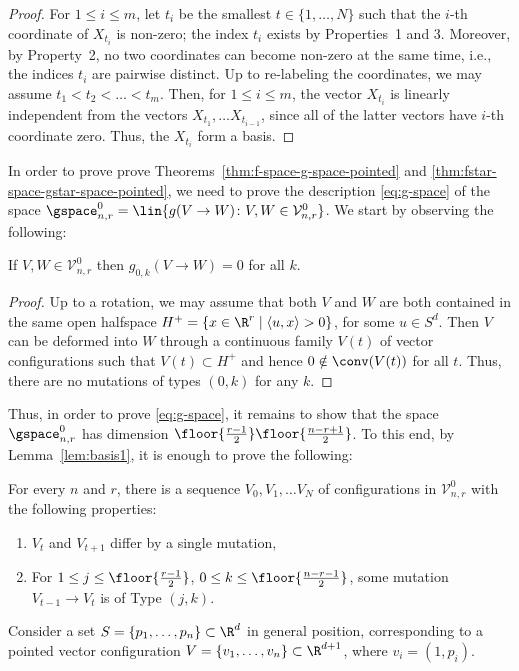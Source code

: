 %
\begin{proof}
For $1 \leq i\leq m$, let $t_i$ be the smallest $t\in \{1,\dots,N\}$ such that the $i$-th coordinate of $X_{t_i}$ is non-zero; the index $t_i$ exists by Properties~1 and 3. Moreover, by Property~2, no two coordinates can become non-zero at the same time, i.e., the indices $t_i$ are pairwise distinct. Up to re-labeling the coordinates, we may assume $t_1 < t_2 < \ldots < t_m$. Then, for $1\leq i \leq m$, the vector $X_{t_i}$ is linearly independent from the vectors $X_{t_1},\dots X_{t_{i-1}}$, since all of the latter vectors have $i$-th coordinate zero. Thus, the $X_{t_i}$ form a basis.
\end{proof}
%
In order to prove prove Theorems~\ref{thm:f-space-g-space-pointed} and \ref{thm:fstar-space-gstar-space-pointed}, we need to prove the description \eqref{eq:g-space} of the space $\gspace_{n,r}^0=\lin\{g(V\to W)\colon V,W \in \mathcal{V}^0_{n,r}\}$. We start by observing the following:
\begin{lemma}
If $V,W \in \mathcal{V}^0_{n,r}$ then $g_{0,k}(V \to W)=0$ for all $k$.
\end{lemma}
%
\begin{proof}
Up to a rotation, we may assume that both $V$ and $W$ are both contained in the same open halfspace $H^+ = \{ x \in \R^r \mid \langle u ,x \rangle > 0 \}$, for some $u \in S^d$. Then $V$ can be deformed into $W$ through a continuous family $V(t)$ of vector configurations such that $V(t) \subset H^+$ and hence $0 \notin \conv (V(t))$ for all $t$. Thus, there are no mutations of types $(0,k)$ for any $k$.
\end{proof}
%
%
Thus, in order to prove \eqref{eq:g-space}, it remains to show that the space $\gspace^0_{n,r}$ has dimension $\floor{\frac{r-1}{2}}\floor{\frac{n-r+1}{2}}$. 
To this end, by Lemma~\ref{lem:basis1}, it is enough to prove the following:
\begin{lemma}
\label{lem:all-mutations}
For every $n$ and $r$, there is a sequence $V_0, V_1, \ldots V_N$ of configurations in $\mathcal{V}^0_{n,r}$ with the following properties:
\begin{enumerate}
\item $V_t$ and $V_{t+1}$ differ by a single mutation,
\item For $1 \leq j \leq \floor{\frac{r-1}{2}}$, $0 \leq k \leq \floor{\frac{n-r-1}{2}}$, some mutation $V_{t-1} \to V_t$ is of Type $(j,k)$.
\end{enumerate}
\end{lemma}
%
Consider a set $S = \{p_1,\dots,p_n \}\subset \R^d$ in general position, corresponding to a pointed vector configuration $V = \{v_1,\dots,v_n\} \subset \R^{d+1}$, where $v_i=(1, p_i)$. 
